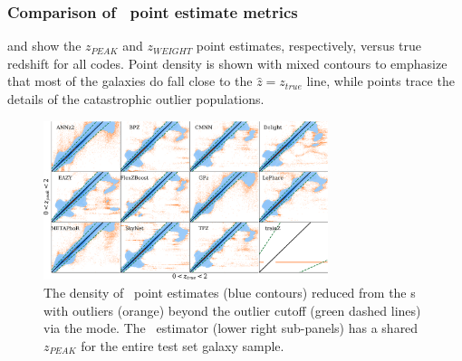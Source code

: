 
\subsubsection{Comparison of \pz\ point estimate metrics}
\label{sec:pointmetrics_results}

 and  show the $z_{PEAK}$ and $z_{WEIGHT}$ point estimates, respectively, versus true redshift for all codes.
Point density is shown with mixed contours to emphasize that most of the galaxies do fall close to the $\hat{z} = z_{true}$ line, while points trace the details of the catastrophic outlier populations.

\begin{figure}
	\centering
	\includegraphics[width=0.74\textwidth]{figures/pzdc1/ZPEAK_AIM.png}
	\caption[The density of \pz\ point estimates reduced from the \pzpdf s via the mode for the codes considered in ]
	{The density of \pz\ point estimates (blue contours) reduced from the \pzpdf s with outliers (orange) beyond the outlier cutoff (green dashed lines) via the mode.
		The \trainz\ estimator (lower right sub-panels) has a shared $z_{PEAK}$ for the entire test set galaxy sample.
	}
\end{figure}

